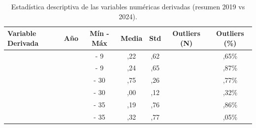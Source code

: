 \begin{table}[htbp]
\centering
\scriptsize
\setlength{\tabcolsep}{4pt}
\renewcommand{\arraystretch}{1.2}
\caption{Estadística descriptiva de las variables numéricas derivadas (resumen 2019 vs 2024).}
\label{tab:estadisticas_numericas_derivadas}
\begin{tabular}{|l|c|c|c|c|c|c|}
\hline
\parbox[t]{3.0cm}{\textbf{Variable Derivada}} & 
\parbox[t]{1.5cm}{\centering\textbf{Año}} & 
\parbox[t]{1.5cm}{\centering\textbf{Mín - Máx}} & 
\parbox[t]{1.5cm}{\centering\textbf{Media}} & 
\parbox[t]{1.5cm}{\centering\textbf{Std}} & 
\parbox[t]{1.5cm}{\centering\textbf{Outliers (N)}} & 
\parbox[t]{1.5cm}{\centering\textbf{Outliers (\%)}} \\ \hline

\parbox[t]{3.0cm}{} & \parbox[t]{1.5cm}{} & \parbox[t]{1.5cm}{ - 9} & \parbox[t]{1.5cm}{,22} & \parbox[t]{1.5cm}{,62} & \parbox[t]{1.5cm}{} & \parbox[t]{1.5cm}{,65\%} \\ 
\parbox[t]{3.0cm}{} & \parbox[t]{1.5cm}{} & \parbox[t]{1.5cm}{ - 9} & \parbox[t]{1.5cm}{,24} & \parbox[t]{1.5cm}{,65} & \parbox[t]{1.5cm}{} & \parbox[t]{1.5cm}{,87\%} \\ \hline

\parbox[t]{3.0cm}{} & \parbox[t]{1.5cm}{} & \parbox[t]{1.5cm}{ - 30} & \parbox[t]{1.5cm}{,75} & \parbox[t]{1.5cm}{,26} & \parbox[t]{1.5cm}{} & \parbox[t]{1.5cm}{,77\%} \\ 
\parbox[t]{3.0cm}{} & \parbox[t]{1.5cm}{} & \parbox[t]{1.5cm}{ - 30} & \parbox[t]{1.5cm}{,00} & \parbox[t]{1.5cm}{,12} & \parbox[t]{1.5cm}{} & \parbox[t]{1.5cm}{,32\%} \\ \hline

\parbox[t]{3.0cm}{} & \parbox[t]{1.5cm}{} & \parbox[t]{1.5cm}{ - 35} & \parbox[t]{1.5cm}{,19} & \parbox[t]{1.5cm}{,76} & \parbox[t]{1.5cm}{} & \parbox[t]{1.5cm}{,86\%} \\ 
\parbox[t]{3.0cm}{} & \parbox[t]{1.5cm}{} & \parbox[t]{1.5cm}{ - 35} & \parbox[t]{1.5cm}{,32} & \parbox[t]{1.5cm}{,77} & \parbox[t]{1.5cm}{} & \parbox[t]{1.5cm}{,05\%} \\ \hline


\end{tabular}
\end{table}
